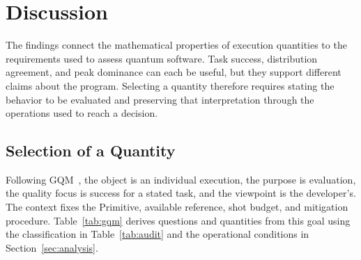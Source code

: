 \documentclass[10pt,conference]{IEEEtran}
\begin{document}
\section{Discussion}
\label{sec:discussion}

The findings connect the mathematical properties of execution quantities to the requirements used to assess quantum software. Task success, distribution agreement, and peak dominance can each be useful, but they support different claims about the program. Selecting a quantity therefore requires stating the behavior to be evaluated and preserving that interpretation through the operations used to reach a decision.

\subsection{Selection of a Quantity}
\label{sec:selection}

Following GQM~\cite{basili1994}, the object is an individual execution, the purpose is evaluation, the quality focus is success for a stated task, and the viewpoint is the developer's. The context fixes the Primitive, available reference, shot budget, and mitigation procedure. Table~\ref{tab:gqm} derives questions and quantities from this goal using the classification in Table~\ref{tab:audit} and the operational conditions in Section~\ref{sec:analysis}.
\end{document}
